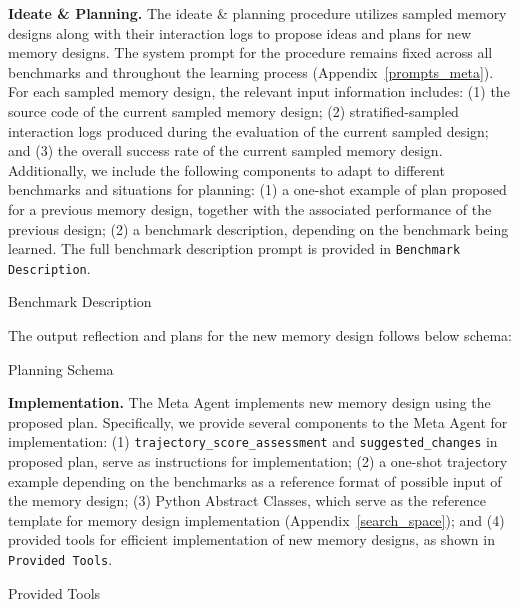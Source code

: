 \documentclass{article}
\theoremstyle{plain}
\theoremstyle{definition}
\theoremstyle{remark}
\begin{document}
\noindent\textbf{Ideate \& Planning.}\hspace{0.5em} 
The ideate \& planning procedure utilizes sampled memory designs along with their interaction logs 
to propose ideas and plans for new memory designs. The system prompt for the procedure 
remains fixed across all benchmarks and throughout the learning process 
(Appendix~\ref{prompts_meta}). For each sampled memory design, the relevant input information includes: 
(1) the source code of the current sampled memory design; 
(2) stratified-sampled interaction logs produced during the evaluation of the current sampled design; 
and (3) the overall success rate of the current sampled memory design.
Additionally, we include the following components to adapt 
to different benchmarks and situations for planning: 
(1) a one-shot example of plan proposed for a previous memory design, together 
with the associated performance of the previous design; 
(2) a benchmark description, depending on the benchmark being learned. The full benchmark description prompt is provided in \texttt{Benchmark Description}.


\begin{topblueprompt}{Benchmark Description}

\end{topblueprompt}

The output reflection and plans for the new memory design follows below schema:
\begin{topblueprompt}{Planning Schema}

\end{topblueprompt}

\noindent\textbf{Implementation.}\hspace{0.5em} 
The Meta Agent implements new memory design using the proposed plan. Specifically, we provide several components to the Meta Agent for implementation: (1) \texttt{trajectory\_score\_assessment} and \texttt{suggested\_changes} in proposed plan, serve as instructions for implementation; (2) a one-shot trajectory example depending on the benchmarks as a reference format of possible input of the memory design; (3) Python Abstract Classes, which serve as the reference template for memory design implementation (Appendix~\ref{search_space}); and (4) provided tools for efficient implementation of new memory designs, as shown in \texttt{Provided Tools}.
\begin{topblueprompt}{Provided Tools}

\end{topblueprompt}
\end{document}
